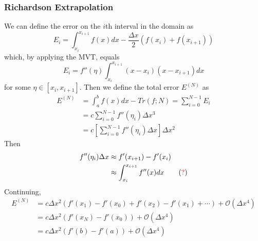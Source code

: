 \documentclass[12pt]{article}
\theoremstyle{definition}
\theoremstyle{definition}
\begin{document}
\subsubsection{Richardson Extrapolation}
We can define the error on the $i$th interval in the domain as
\begin{equation}
	E_i = \int_{x_i}^{x_{i+1}} f(x)dx - \frac{\Delta x}{2}\left(f(x_i) + f(x_{i+1}) \right)
\end{equation}
which, by applying the MVT, equals
\begin{equation}
	E_i= f''(\eta) \int_{x_i}^{x_{i+1}} (x - x_i)(x - x_{i+1}) dx
\end{equation}
for some $\eta \in [x_i, x_{i+1}]$. Then we define the total error $E^{(N)}$ as
\begin{align*}
	E^{(N)} &= \int_a^b f(x)dx - Tr(f;N) = \sum_{i=0}^{N-1}E_i \\
	&= c \sum_{i=0}^{N-1} f''(\eta_i) \Delta x^3 \\
	&= c\left[\sum_{i=0}^{N-1} f''(\eta_i) \Delta x \right] \Delta x^2 
\end{align*}
Then
\begin{align*}
	f''(\eta_i) \Delta x &\approx f'(x_{i+1}) - f'(x_i) \\
	&\approx \int_{x_i}^{x_{i+1}} f''(x) dx \tag{\textcolor{red}{?}}
\end{align*}
Continuing,
\begin{align*}
	E^{(N)} &= c \Delta x^2 ( f'(x_1) - f'(x_0) + f'(x_2) - f'(x_1) + \cdots) + \mathcal{O}(\Delta x^4)\\
	&= c \Delta x^2 (f'(x_N) - f'(x_0)) + \mathcal{O}(\Delta x^4)\\
	&= c \Delta x^2 (f'(b) - f'(a)) + \mathcal{O}(\Delta x^4) 
\end{align*}
\end{document}
